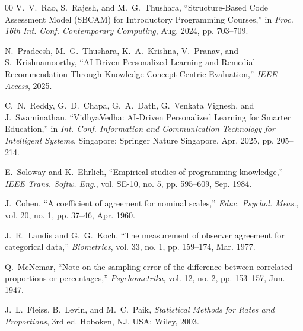 \begin{thebibliography}{00}
V.~V.~Rao, S.~Rajesh, and M.~G.~Thushara, ``Structure-Based Code Assessment Model (SBCAM) for Introductory Programming Courses,'' in \emph{Proc. 16th Int. Conf. Contemporary Computing}, Aug. 2024, pp. 703--709.

N.~Pradeesh, M.~G.~Thushara, K.~A.~Krishna, V.~Pranav, and S.~Krishnamoorthy, ``AI-Driven Personalized Learning and Remedial Recommendation Through Knowledge Concept-Centric Evaluation,'' \emph{IEEE Access}, 2025.

C.~N.~Reddy, G.~D.~Chapa, G.~A.~Dath, G.~Venkata Vignesh, and J.~Swaminathan, ``VidhyaVedha: AI-Driven Personalized Learning for Smarter Education,'' in \emph{Int. Conf. Information and Communication Technology for Intelligent Systems}, Singapore: Springer Nature Singapore, Apr. 2025, pp. 205--214.

E.~Soloway and K.~Ehrlich, ``Empirical studies of programming knowledge,'' \emph{IEEE Trans. Softw. Eng.}, vol. SE-10, no. 5, pp. 595--609, Sep. 1984.


J.~Cohen, ``A coefficient of agreement for nominal scales,'' \emph{Educ. Psychol. Meas.}, vol. 20, no. 1, pp. 37--46, Apr. 1960.

J.~R.~Landis and G.~G.~Koch, ``The measurement of observer agreement for categorical data,'' \emph{Biometrics}, vol. 33, no. 1, pp. 159--174, Mar. 1977.


Q.~McNemar, ``Note on the sampling error of the difference between correlated proportions or percentages,'' \emph{Psychometrika}, vol. 12, no. 2, pp. 153--157, Jun. 1947.

J.~L.~Fleiss, B.~Levin, and M.~C.~Paik, \emph{Statistical Methods for Rates and Proportions}, 3rd ed. Hoboken, NJ, USA: Wiley, 2003.

\end{thebibliography}
